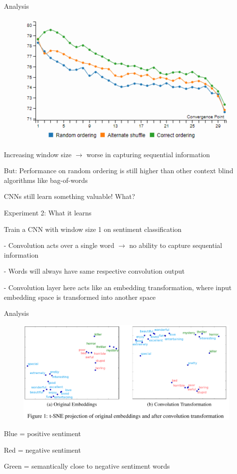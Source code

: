 \documentclass[12pt]{beamer}
\begin{document}
\begin{frame}{Analysis}
	
	\begin{figure}
		\includegraphics[width=0.5\linewidth]{img/cnnanalysis1.png}
	\end{figure}


Increasing window size $\to$ worse in capturing sequential information

But: Performance on random ordering is still higher than other context blind algorithms like bag-of-words

CNNs still learn something valuable! What?
	
\end{frame}


\begin{frame}{Experiment 2: What it learns}

Train a CNN with window size 1 on sentiment classification

- Convolution acts over a single word $\to$ no ability to capture sequential information
	
- Words will always have same respective convolution output

- Convolution layer here acts like an embedding transformation, where input embedding space is transformed into another space
	
	
\end{frame}


\begin{frame}{Analysis}
	
	\begin{figure}
	\includegraphics[width=1.0\linewidth]{img/cnnanalysis2.png}
\end{figure}


Blue = positive sentiment

Red = negative sentiment

Green = semantically close to negative sentiment words

\end{frame}
\end{document}

